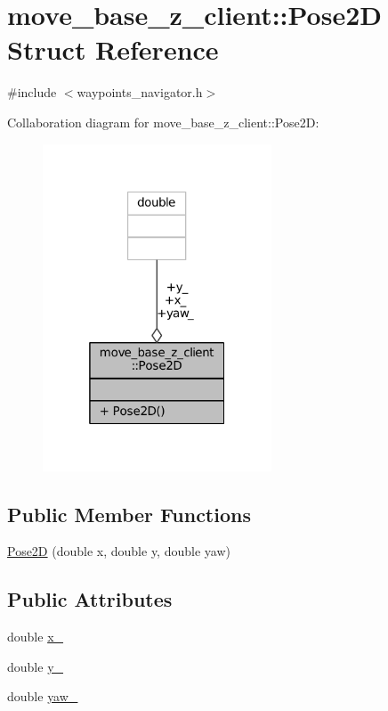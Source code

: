 \hypertarget{structmove__base__z__client_1_1Pose2D}{}\section{move\+\_\+base\+\_\+z\+\_\+client\+:\+:Pose2D Struct Reference}
\label{structmove__base__z__client_1_1Pose2D}


{\ttfamily \#include $<$waypoints\+\_\+navigator.\+h$>$}



Collaboration diagram for move\+\_\+base\+\_\+z\+\_\+client\+:\+:Pose2D\+:
\nopagebreak
\begin{figure}[H]
\begin{center}
\leavevmode
\includegraphics[width=193pt]{structmove__base__z__client_1_1Pose2D__coll__graph}
\end{center}
\end{figure}
\subsection*{Public Member Functions}
\begin{DoxyCompactItemize}
\item 
\hyperlink{structmove__base__z__client_1_1Pose2D_a97f60b5516b80f09472f178afd07b7ab}{Pose2D} (double x, double y, double yaw)
\end{DoxyCompactItemize}
\subsection*{Public Attributes}
\begin{DoxyCompactItemize}
\item 
double \hyperlink{structmove__base__z__client_1_1Pose2D_a92b53110c2fdd77c18275d6e16709581}{x\+\_\+}
\item 
double \hyperlink{structmove__base__z__client_1_1Pose2D_a10e59f372c758bffb00bfaaca43ec1fc}{y\+\_\+}
\item 
double \hyperlink{structmove__base__z__client_1_1Pose2D_a75fda2f20515d0acdb83d33017e6c97e}{yaw\+\_\+}
\end{DoxyCompactItemize}


